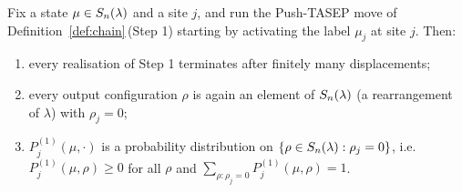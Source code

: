 \begin{qthreeproposition}\label{prop:step1}
Fix a state $\mu\in S_n(\lambda)$ and a site $j$, and run the Push-TASEP move of
Definition~\ref{def:chain}\,\textup{(Step 1)} starting by activating the label
$\mu_j$ at site $j$. Then:
\begin{enumerate}
\item[\textup{(a)}] every realisation of Step 1 terminates after finitely many
displacements;
\item[\textup{(b)}] every output configuration $\rho$ is again an element of
$S_n(\lambda)$ (a rearrangement of $\lambda$) with $\rho_j=0$;
\item[\textup{(c)}] $P^{(1)}_j(\mu,\cdot)$ is a probability distribution on
$\{\rho\in S_n(\lambda):\rho_j=0\}$, i.e.\ $P^{(1)}_j(\mu,\rho)\ge0$ for all $\rho$
and $\sum_{\rho:\rho_j=0}P^{(1)}_j(\mu,\rho)=1$.
\end{enumerate}
\end{qthreeproposition}


